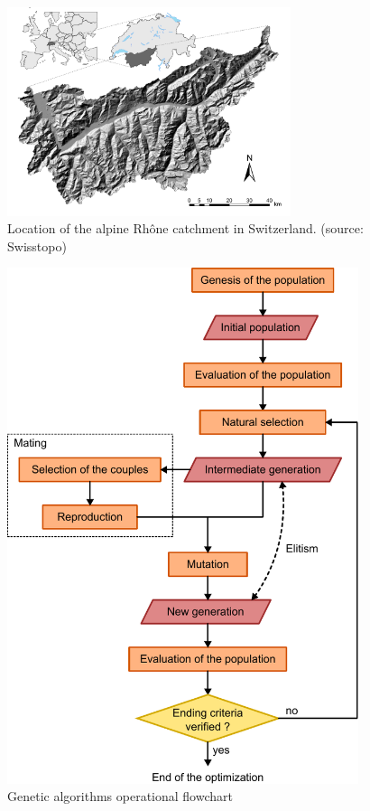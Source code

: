 \documentclass{ametsoc}
\begin{document}
\begin{figure}[htb]
	\centerline{\includegraphics[width=8.3cm]{figure_map.pdf}}
	\caption{Location of the alpine Rhône catchment in Switzerland. (source: Swisstopo)}
	\label{figure_map}
\end{figure}


\begin{figure}[htb]
	\centerline{\includegraphics[width=10.3cm]{figure_structure_gas.pdf}}
	\caption{Genetic algorithms operational flowchart}
	\label{figure_structure_gas}
\end{figure}
\end{document}
